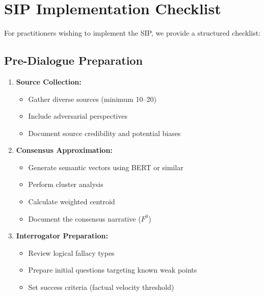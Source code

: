 \documentclass[11pt,a4paper]{article}
\begin{document}
\section{SIP Implementation Checklist}
\label{app:checklist}

For practitioners wishing to implement the SIP, we provide a structured checklist:

\subsection*{Pre-Dialogue Preparation}
\begin{enumerate}[leftmargin=*]
    \item \textbf{Source Collection:}
    \begin{itemize}[nosep]
        \item Gather diverse sources (minimum 10--20)
        \item Include adversarial perspectives
        \item Document source credibility and potential biases
    \end{itemize}
    
    \item \textbf{Consensus Approximation:}
    \begin{itemize}[nosep]
        \item Generate semantic vectors using BERT or similar
        \item Perform cluster analysis
        \item Calculate weighted centroid
        \item Document the consensus narrative ($F^0$)
    \end{itemize}
    
    \item \textbf{Interrogator Preparation:}
    \begin{itemize}[nosep]
        \item Review logical fallacy types
        \item Prepare initial questions targeting known weak points
        \item Set success criteria (factual velocity threshold)
    \end{itemize}
\end{enumerate}
\end{document}
